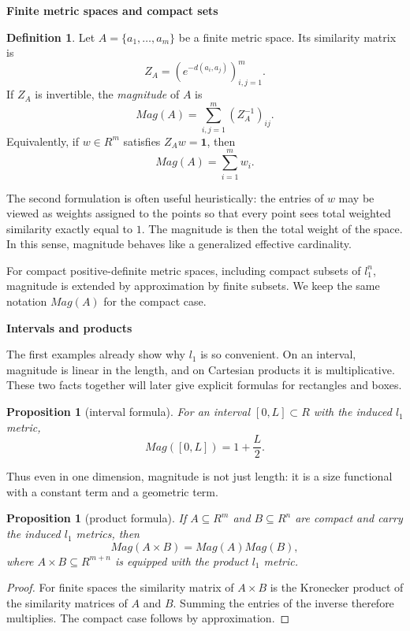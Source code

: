 \documentclass{article}
\def\ell{l}%
\def\Mag{Mag}%
\def\R{R}%
\newtheorem{proposition}[theorem]{Proposition}
\theoremstyle{definition}
\newtheorem{definition}[theorem]{Definition}
\newcommand{\Mag}{\operatorname{Mag}}
\newcommand{\R}{\mathbb{R}}
\newcommand{\1}{\mathbf{1}}
\newcommand{\myparagraph}[1]{\medskip\noindent\textbf{#1}}
\begin{document}
\myparagraph{Finite metric spaces and compact sets}
\begin{definition}
Let \(A=\{a_1,\dots,a_m\}\) be a finite metric space. Its similarity matrix is
\[
Z_A=(e^{-d(a_i,a_j)})_{i,j=1}^m.
\]
If \(Z_A\) is invertible, the \emph{magnitude} of \(A\) is
\[
\Mag(A)=\sum_{i,j=1}^m (Z_A^{-1})_{ij}.
\]
Equivalently, if \(w\in\R^m\) satisfies \(Z_A w=\1\), then
\[
\Mag(A)=\sum_{i=1}^m w_i.
\]
\end{definition}

The second formulation is often useful heuristically: the entries of \(w\) may be viewed as weights assigned to the points so that every point sees total weighted similarity exactly equal to \(1\). The magnitude is then the total weight of the space. In this sense, magnitude behaves like a generalized effective cardinality.

For compact positive-definite metric spaces, including compact subsets of \(\ell_1^n\), magnitude is extended by approximation by finite subsets. We keep the same notation \(\Mag(A)\) for the compact case.

\myparagraph{Intervals and products}

The first examples already show why \(\ell_1\) is so convenient. On an interval, magnitude is linear in the length, and on Cartesian products it is multiplicative. These two facts together will later give explicit formulas for rectangles and boxes.

\begin{proposition}[interval formula]
For an interval \([0,L]\subset \R\) with the induced \(\ell_1\) metric,
\[
\Mag([0,L])=1+\frac{L}{2}.
\]
\end{proposition}

Thus even in one dimension, magnitude is not just length: it is a size functional with a constant term and a geometric term.

\begin{proposition}[product formula]
If \(A\subseteq \R^m\) and \(B\subseteq \R^n\) are compact and carry the induced \(\ell_1\) metrics, then
\[
\Mag(A\times B)=\Mag(A)\Mag(B),
\]
where \(A\times B\subseteq \R^{m+n}\) is equipped with the product \(\ell_1\) metric.
\end{proposition}

\begin{proof}
For finite spaces the similarity matrix of \(A\times B\) is the Kronecker product of the similarity matrices of \(A\) and \(B\). Summing the entries of the inverse therefore multiplies. The compact case follows by approximation.
\end{proof}
\end{document}
